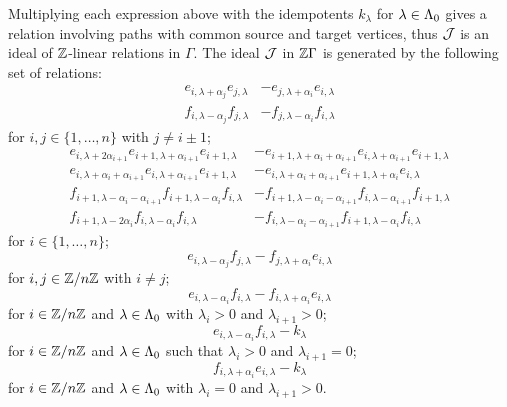 \documentclass[a4paper, 11pt, twoside]{report}
\begin{document}
Multiplying each expression above with the idempotents $k_\lambda$ for $\lambda\in\Lambda_0{}$ gives a relation involving paths with common source and target vertices, thus $\mathcal{J}$ is an ideal of $\mathbb{Z}$-linear relations in $\Gamma$. The ideal $\mathcal{J}$ in $\mathbb{Z}\Gamma$ is generated by the following set of relations:
\begin{align*}
e_{i,\lambda+\alpha_j}e_{j,\lambda} &- e_{j,\lambda+\alpha_i}e_{i,\lambda}\\
f_{i,\lambda-\alpha_j}f_{j,\lambda} &- f_{j,\lambda-\alpha_i}f_{i,\lambda}
\end{align*}
for $i,j\in\{1,\ldots,n\}$ with $j\neq i\pm 1$;
\begin{align*}
e_{i,\lambda+2\alpha_{i+1}}e_{i+1,\lambda+\alpha_{i+1}}e_{i+1,\lambda} &- e_{i+1,\lambda+\alpha_i+\alpha_{i+1}}e_{i,\lambda+\alpha_{i+1}}e_{i+1,\lambda}\\
e_{i,\lambda+\alpha_i+\alpha_{i+1}}e_{i,\lambda+\alpha_{i+1}}e_{i+1,\lambda} &- e_{i,\lambda+\alpha_i+\alpha_{i+1}}e_{i+1,\lambda+\alpha_i}e_{i,\lambda}\\
f_{i+1,\lambda-\alpha_i-\alpha_{i+1}}f_{i+1,\lambda-\alpha_i}f_{i,\lambda} &- f_{i+1,\lambda-\alpha_i-\alpha_{i+1}}f_{i,\lambda-\alpha_{i+1}}f_{i+1,\lambda}\\
f_{i+1,\lambda-2\alpha_i}f_{i,\lambda-\alpha_i}f_{i,\lambda} &- f_{i,\lambda-\alpha_i-\alpha_{i+1}}f_{i+1,\lambda-\alpha_i}f_{i,\lambda}
\end{align*}
for $i\in\{1,\ldots,n\}$;
\begin{equation*}
e_{i,\lambda-\alpha_j}f_{j,\lambda} - f_{j,\lambda+\alpha_i}e_{i,\lambda}
\end{equation*}
for $i,j\in\mathbb{Z}/{n \mathbb{Z}}$ with $i\neq j$;
\begin{equation*}
e_{i,\lambda-\alpha_i}f_{i,\lambda} - f_{i,\lambda+\alpha_i}e_{i,\lambda}
\end{equation*}
for $i\in\mathbb{Z}/{n \mathbb{Z}}$ and $\lambda\in\Lambda_0{}$ with $\lambda_i>0$ and $\lambda_{i+1}>0$;
\begin{equation*}
e_{i,\lambda-\alpha_i}f_{i,\lambda} - k_\lambda
\end{equation*}
for $i\in\mathbb{Z}/{n \mathbb{Z}}$ and $\lambda\in\Lambda_0{}$ such that $\lambda_i>0$ and $\lambda_{i+1}=0$;
\begin{equation*}
f_{i,\lambda+\alpha_i}e_{i,\lambda} - k_\lambda
\end{equation*}
for $i\in\mathbb{Z}/{n \mathbb{Z}}$ and $\lambda\in\Lambda_0{}$ with $\lambda_i=0$ and $\lambda_{i+1}>0$.
\end{document}
